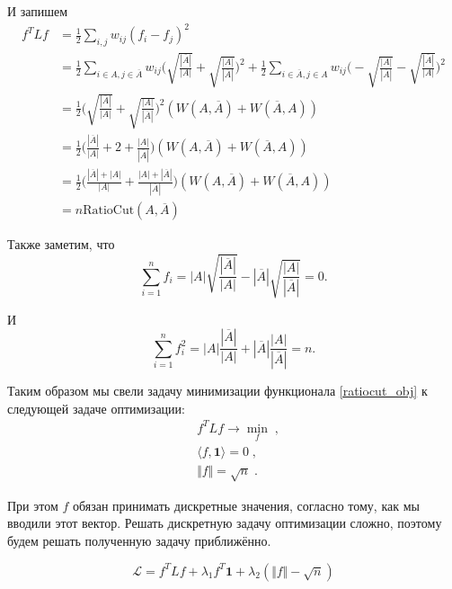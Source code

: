 \documentclass[12pt,a4paper]{article}
\begin{document}
И запишем
\begin{align*}
	f^T L f & = \frac{1}{2} \sum_{i,j}w_{ij}(f_i -f _j)^2\\
	& = \frac{1}{2} \sum_{i\in A, j\in \overline{A}}w_{ij}\bigg(\sqrt{\frac{|\overline{A}|}{|A|}} + \sqrt{\frac{|A|}{|\overline{A}|}}\bigg)^2 
	+ \frac{1}{2} \sum_{i\in \overline{A}, j\in A}w_{ij}\bigg(-\sqrt{\frac{|A|}{|\overline{A}|}} - \sqrt{\frac{|\overline{A}|}{|A|}}\bigg)^2 \\
	& = \frac{1}{2}\bigg(\sqrt{\frac{|\overline{A}|}{|A|}} + \sqrt{\frac{|A|}{|\overline{A}|}}\bigg)^2 (W(A, \overline{A}) + W(\overline{A}, A))\\
	& = \frac{1}{2}\bigg(\frac{|\overline{A}|}{|A|} + 2 + \frac{|A|}{|\overline{A}|}\bigg) (W(A, \overline{A}) + W(\overline{A}, A))\\
	& = \frac{1}{2} \bigg(\frac{|\overline{A}| + |A|}{|A|} + \frac{|A| + |\overline{A}|}{|\overline{A}|}\bigg) (W(A, \overline{A}) + W(\overline{A}, A))\\
	& = n\text{RatioCut}(A, \overline{A})
\end{align*}

Также заметим, что  
\begin{equation*}
	\sum_{i=1}^n f_i = |A|\sqrt{\frac{|\overline{A}|}{|A|}} - |\overline{A}|\sqrt{\frac{|A|}{|\overline{A}|}} = 0.
\end{equation*}

И 
\begin{equation*}
	\sum_{i=1}^n f_i^2 = |A|\frac{|\overline{A}|}{|A|} + |\overline{A}|\frac{|A|}{|\overline{A}|} = n.
\end{equation*}

Таким образом мы свели задачу минимизации функционала \ref{ratiocut_obj} к следующей задаче оптимизации:
\begin{align*}
	& f^T L f \rightarrow \min_f \; ,\\
	& \langle f, \mathbf{1} \rangle = 0 \; ,\\
	& \Vert f \Vert = \sqrt{n} \;.
\end{align*}

При этом $f$ обязан принимать дискретные значения, согласно тому, как мы вводили этот вектор. Решать дискретную задачу оптимизации сложно, поэтому будем решать полученную задачу приближённо.

\begin{equation*}
	\mathcal{L} = f^T L f + \lambda_1 f^T \mathbf{1} + \lambda_2 (\Vert f \Vert - \sqrt{n})
\end{equation*}
\end{document}
